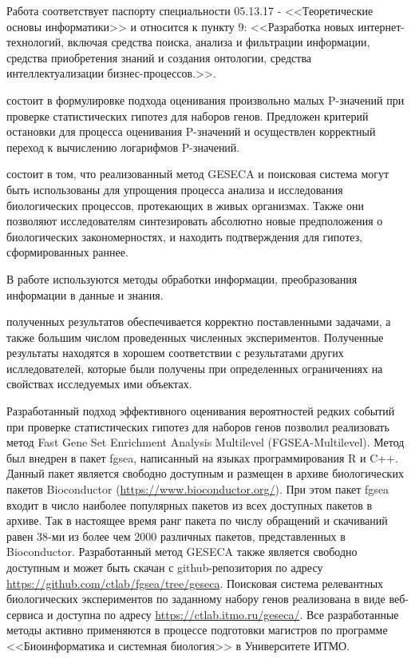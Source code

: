 {\passport} Работа соответствует паспорту специальности 05.13.17 - <<Теоретические основы информатики>> и относится к пункту 9: <<Разработка новых интернет-технологий, включая средства поиска, анализа и фильтрации информации, средства приобретения знаний и создания онтологии, средства интеллектуализации бизнес-процессов.>>.

{\theorinfluence} состоит в формулировке подхода оценивания произвольно малых P-значений при проверке статистических гипотез для наборов генов. Предложен критерий остановки для процесса оценивания P-значений и осуществлен корректный переход к вычислению логарифмов P-значений.

{\influence} состоит в том, что реализованный метод GESECA и поисковая система могут быть использованы для упрощения процесса анализа и исследования биологических процессов, протекающих в живых организмах. 
Также они позволяют исследователям синтезировать абсолютно новые предположения о биологических закономерностях, и находить подтверждения для гипотез, сформированных раннее. 

{\methods} В работе используются методы обработки информации, преобразования информации в данные и знания.


{\reliability} полученных результатов обеспечивается корректно поставленными задачами, а также большим числом проведенных численных экспериментов.
Полученные результаты находятся в хорошем соответствии с результатами других ислледователей, которые были получены при определенных ограничениях на свойствах исследуемых ими объектах.

{\integration} Разработанный подход эффективного оценивания вероятностей редких событий при проверке статистических гипотез для наборов генов позволил реализовать метод Fast Gene Set Enrichment Analysis Multilevel (FGSEA-Multilevel).
Метод был внедрен в пакет fgsea, написанный на языках программирования R и C++. 
Данный пакет является свободно доступным и размещен в архиве биологических пакетов Bioconductor (\url{https://www.bioconductor.org/}).
При этом пакет fgsea входит в число наиболее популярных пакетов из всех доступных пакетов в архиве.
Так в настоящее время ранг пакета по числу обращений и скачиваний равен 38-ми из более чем 2000 различных пакетов, представленных в Bioconductor.
Разработанный метод GESECA также является свободно доступным и может быть скачан с github-репозитория по адресу \url{https://github.com/ctlab/fgsea/tree/geseca}. Поисковая система релевантных биологических экспериментов по заданному набору генов реализована в виде веб-сервиса и доступна по адресу \url{https://ctlab.itmo.ru/geseca/}. Все разработанные методы активно применяются в процессе подготовки магистров по программе <<Биоинформатика и системная биология>> в Университете ИТМО.


